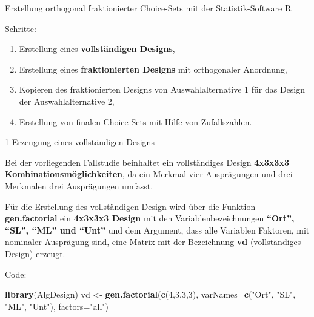 \documentclass[12pt,ngerman,a4paper,ignorenonframetext,]{beamer}
\newenvironment{Shaded}{\begin{snugshade}}{\end{snugshade}}
\newcommand{\DataTypeTok}[1]{\textcolor[rgb]{0.13,0.29,0.53}{#1}}
\newcommand{\DecValTok}[1]{\textcolor[rgb]{0.00,0.00,0.81}{#1}}
\newcommand{\KeywordTok}[1]{\textcolor[rgb]{0.13,0.29,0.53}{\textbf{#1}}}
\newcommand{\NormalTok}[1]{#1}
\newcommand{\StringTok}[1]{\textcolor[rgb]{0.31,0.60,0.02}{#1}}
\providecommand{\tightlist}{%
  \setlength{\itemsep}{0pt}\setlength{\parskip}{0pt}}
\begin{document}
\begin{frame}{Erstellung orthogonal fraktionierter Choice-Sets mit der
Statistik-Software R}
\protect\hypertarget{erstellung-orthogonal-fraktionierter-choice-sets-mit-der-statistik-software-r}{}

Schritte:

\begin{enumerate}
\tightlist
\item
  Erstellung eines \textbf{vollständigen Designs},
\item
  Erstellung eines \textbf{fraktionierten Designs} mit orthogonaler
  Anordnung,
\item
  Kopieren des fraktionierten Designs von Auswahlalternative 1 für das
  Design der Auswahlalternative 2,
\item
  Erstellung von finalen Choice-Sets mit Hilfe von Zufallszahlen.
\end{enumerate}

\end{frame}

\begin{frame}[fragile]{1 Erzeugung eines vollständigen Designs}
\protect\hypertarget{erzeugung-eines-vollstandigen-designs}{}

Bei der vorliegenden Fallstudie beinhaltet ein vollständiges Design
\textbf{4x3x3x3 Kombinationsmöglichkeiten}, da ein Merkmal vier
Ausprägungen und drei Merkmalen drei Ausprägungen umfasst.

Für die Erstellung des vollständigen Design wird über die Funktion
\textbf{gen.factorial} ein \textbf{4x3x3x3 Design} mit den
Variablenbezeichnungen \textbf{``Ort'', ``SL'', ``ML'' und ``Unt''} und
dem Argument, dass alle Variablen Faktoren, mit nominaler Ausprägung
sind, eine Matrix mit der Bezeichnung \textbf{vd} (vollständiges Design)
erzeugt.

Code:

\begin{Shaded}
\begin{Highlighting}[]
\KeywordTok{library}\NormalTok{(AlgDesign)}
\NormalTok{vd <-}\StringTok{ }\KeywordTok{gen.factorial}\NormalTok{(}\KeywordTok{c}\NormalTok{(}\DecValTok{4}\NormalTok{,}\DecValTok{3}\NormalTok{,}\DecValTok{3}\NormalTok{,}\DecValTok{3}\NormalTok{), }
                    \DataTypeTok{varNames=}\KeywordTok{c}\NormalTok{(}\StringTok{"Ort"}\NormalTok{, }\StringTok{"SL"}\NormalTok{, }\StringTok{"ML"}\NormalTok{, }\StringTok{"Unt"}\NormalTok{), }
                    \DataTypeTok{factors=}\StringTok{"all"}\NormalTok{)}
\end{Highlighting}
\end{Shaded}

\end{frame}
\end{document}
